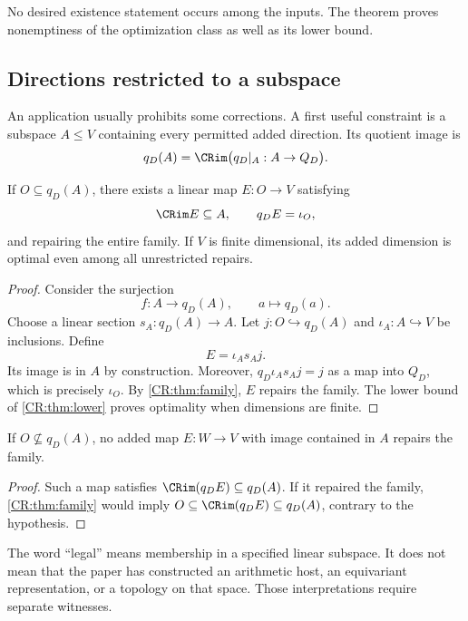 No desired existence statement occurs among the inputs. The theorem proves nonemptiness of the optimization class as well as its lower bound.

\subsection{Directions restricted to a subspace}
An application usually prohibits some corrections. A first useful constraint is a subspace $A\leq V$ containing every permitted added direction. Its quotient image is
\[
q_D(A)=\CRim\bigl(q_D\vert_A:A\to Q_D\bigr).
\]

\begin{CRtheorem}\label{CR:thm:legal}
If $O\subseteq q_D(A)$, there exists a linear map $E:O\to V$ satisfying
\[
\CRim E\subseteq A,\qquad q_DE=\iota_O,
\]
and repairing the entire family. If $V$ is finite dimensional, its added dimension is optimal even among all unrestricted repairs.
\end{CRtheorem}
\begin{proof}
Consider the surjection
\[
f:A\longrightarrow q_D(A),\qquad a\longmapsto q_D(a).
\]
Choose a linear section $s_A:q_D(A)\to A$. Let $j:O\hookrightarrow q_D(A)$ and $\iota_A:A\hookrightarrow V$ be inclusions. Define
\[
E=\iota_As_Aj.
\]
Its image is in $A$ by construction. Moreover, $q_D\iota_As_Aj=j$ as a map into $Q_D$, which is precisely $\iota_O$. By \cref{CR:thm:family}, $E$ repairs the family. The lower bound of \cref{CR:thm:lower} proves optimality when dimensions are finite.
\end{proof}

\begin{CRtheorem}\label{CR:thm:legal-no-go}
If $O\not\subseteq q_D(A)$, no added map $E:W\to V$ with image contained in $A$ repairs the family.
\end{CRtheorem}
\begin{proof}
Such a map satisfies $\CRim(q_DE)\subseteq q_D(A)$. If it repaired the family, \cref{CR:thm:family} would imply $O\subseteq\CRim(q_DE)\subseteq q_D(A)$, contrary to the hypothesis.
\end{proof}

The word ``legal'' means membership in a specified linear subspace. It does not mean that the paper has constructed an arithmetic host, an equivariant representation, or a topology on that space. Those interpretations require separate witnesses.

